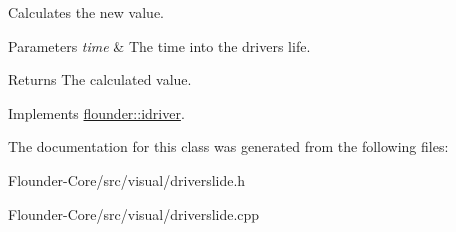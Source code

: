 Calculates the new value. 


\begin{DoxyParams}{Parameters}
{\em time} & The time into the drivers life. \\
\hline
\end{DoxyParams}
\begin{DoxyReturn}{Returns}
The calculated value. 
\end{DoxyReturn}


Implements \hyperlink{classflounder_1_1idriver_a034c4159dc98c4c37ffdfaae64e4a16d}{flounder\+::idriver}.



The documentation for this class was generated from the following files\+:\begin{DoxyCompactItemize}
\item 
Flounder-\/\+Core/src/visual/driverslide.\+h\item 
Flounder-\/\+Core/src/visual/driverslide.\+cpp\end{DoxyCompactItemize}
